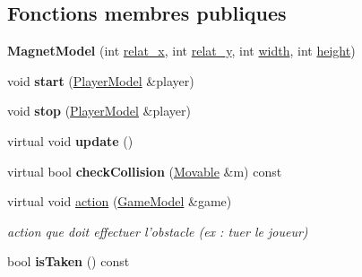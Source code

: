 \subsection*{Fonctions membres publiques}
\begin{DoxyCompactItemize}
\item 
\hypertarget{class_magnet_model_ad2fcdeac407b2c1bbe86d4e97c4feadb}{{\bfseries Magnet\+Model} (int \hyperlink{class_obstacle_a37056563c8469b38aa240c7c423d7280}{relat\+\_\+x}, int \hyperlink{class_obstacle_a754f463db00e74fd5d66a758e4458c26}{relat\+\_\+y}, int \hyperlink{class_movable_a7e4607cccfcc96d2007c2e39c44cab54}{width}, int \hyperlink{class_movable_a192073065bc62d054f259c3b1522c09e}{height})}\label{class_magnet_model_ad2fcdeac407b2c1bbe86d4e97c4feadb}

\item 
\hypertarget{class_magnet_model_a313ed7cbf49e191140c5dc9da3d45a72}{void {\bfseries start} (\hyperlink{class_player_model}{Player\+Model} \&player)}\label{class_magnet_model_a313ed7cbf49e191140c5dc9da3d45a72}

\item 
\hypertarget{class_magnet_model_a2e0ec03bd3b1b73c62f9dde3d706ea50}{void {\bfseries stop} (\hyperlink{class_player_model}{Player\+Model} \&player)}\label{class_magnet_model_a2e0ec03bd3b1b73c62f9dde3d706ea50}

\item 
\hypertarget{class_magnet_model_a852ccdad9cd1415a6ed91775b40c025b}{virtual void {\bfseries update} ()}\label{class_magnet_model_a852ccdad9cd1415a6ed91775b40c025b}

\item 
\hypertarget{class_magnet_model_a1f207284ab6fceb18a42811794423401}{virtual bool {\bfseries check\+Collision} (\hyperlink{class_movable}{Movable} \&m) const }\label{class_magnet_model_a1f207284ab6fceb18a42811794423401}

\item 
\hypertarget{class_magnet_model_afc26aa6cd8a231da5e5745cc05629408}{virtual void \hyperlink{class_magnet_model_afc26aa6cd8a231da5e5745cc05629408}{action} (\hyperlink{class_game_model}{Game\+Model} \&game)}\label{class_magnet_model_afc26aa6cd8a231da5e5745cc05629408}

\begin{DoxyCompactList}\small\item\em action que doit effectuer l'obstacle (ex \+: tuer le joueur) \end{DoxyCompactList}\item 
\hypertarget{class_magnet_model_a0263761cbd38ab84c74a81474ff81887}{bool {\bfseries is\+Taken} () const }\label{class_magnet_model_a0263761cbd38ab84c74a81474ff81887}

\end{DoxyCompactItemize}
